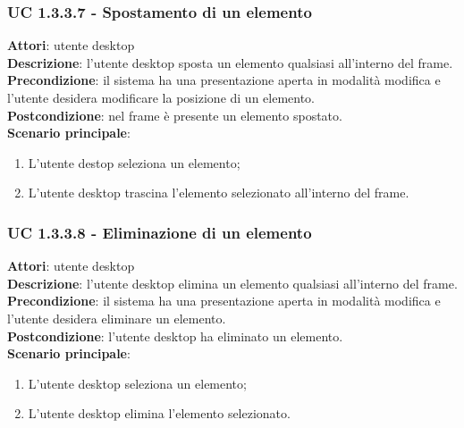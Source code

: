 \subsubsection{UC 1.3.3.7 - Spostamento di un elemento}{
	\label{uc1.3.3.7}
	\textbf{Attori}: utente desktop \\
	\textbf{Descrizione}: l'utente desktop sposta un elemento qualsiasi all'interno del frame. \\
	\textbf{Precondizione}: il sistema ha una presentazione aperta in modalità modifica e l'utente desidera modificare la posizione di un elemento.	\\
	\textbf{Postcondizione}: nel frame è presente un elemento spostato.	\\
	\textbf{Scenario principale}:
	\begin{enumerate}
		\item L'utente destop seleziona un elemento;
		\item L'utente desktop trascina l'elemento selezionato all'interno del frame.
	\end{enumerate}
	}
\subsubsection{UC 1.3.3.8 - Eliminazione di un elemento}{
	\label{uc1.3.3.8}
	\textbf{Attori}: utente desktop \\
	\textbf{Descrizione}: l'utente desktop elimina un elemento qualsiasi all'interno del frame. \\
	\textbf{Precondizione}: il sistema ha una presentazione aperta in modalità modifica e l'utente desidera eliminare un elemento.	\\
	\textbf{Postcondizione}: l'utente desktop ha eliminato un elemento.	\\
	\textbf{Scenario principale}:
	\begin{enumerate}
		\item L'utente desktop seleziona un elemento;
		\item L'utente desktop elimina l'elemento selezionato.
	\end{enumerate}
	}
